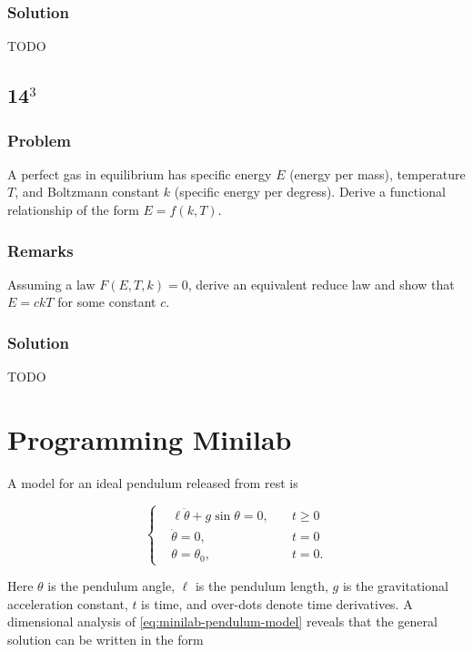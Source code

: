 \documentclass[12pt]{article}
\begin{document}
  \subsubsection*{Solution}
  {\huge \color{red}TODO}

\subsection{14$^3$}
  \subsubsection*{Problem}
  A perfect gas in equilibrium has specific energy $E$ (energy per mass),
  temperature $T$, and Boltzmann constant $k$ (specific energy per degress).
  Derive a functional relationship of the form $E=f(k,T)$.

  \subsubsection*{Remarks}
  Assuming a law $F(E,T,k)=0$, derive an equivalent reduce law and show that
  $E=ckT$ for some constant $c$.

  \subsubsection*{Solution}
  {\huge \color{red}TODO}

\section{Programming Minilab}
A model for an ideal pendulum released from rest is

\begin{equation}
  \label{eq:minilab-pendulum-model}
   \left\{
  \begin{aligned}
    &\ell\ddot{\theta}+g\sin\theta = 0, \quad & t\ge0 \\
    &\dot{\theta} = 0, \quad & t = 0 \\
    &\theta = \theta_0, \quad & t = 0.
  \end{aligned}\right.
\end{equation}

Here $\theta$ is the pendulum angle, $\ell$ is the pendulum length, $g$ is the
gravitational acceleration constant, $t$ is time, and over-dots denote time
derivatives. A dimensional analysis of \cref{eq:minilab-pendulum-model} reveals
that the general solution can be written in the form
\end{document}
